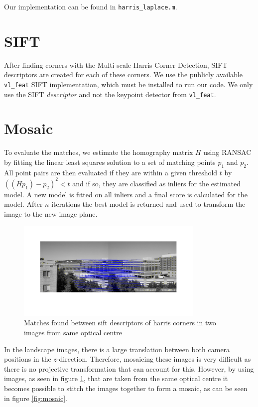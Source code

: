\documentclass[a4paper,10pt]{article}
\begin{document}
Our implementation can be found in \verb+harris_laplace.m+.

\section{SIFT}
After finding corners with the Multi-scale Harris Corner Detection, SIFT descriptors are created for each of these corners.
We use the publicly available \verb+vl_feat+ SIFT implementation, which must be installed to run our code.
We only use the SIFT \emph{descriptor} and not the keypoint detector from \verb+vl_feat+.



\section{Mosaic}
To evaluate the matches, we estimate the homography matrix $H$ using RANSAC by fitting the linear least squares solution to a set of matching points $p_1$ and $p_2$. All point pairs are then evaluated if they are within a given threshold $t$ by $((H p_1)-p_2)^2 < t$ and if so, they are classified as inliers for the estimated model. A new model is fitted on all inliers and a final score is calculated for the model. After $n$ iterations the best model is returned and used to transform the image to the new image plane. 

\begin{figure}[h!t]
\centering
\includegraphics[width=0.8\textwidth]{img/mosaicmatch}
\caption{Matches found between sift descriptors of harris corners in two images from same optical centre}
\label{fig:mosaicmatch}
\end{figure}

In the landscape images, there is a large translation between both camera positions in the $z$-direction. Therefore, mosaicing these images is very difficult as there is no projective transformation that can account for this. However, by using images, as seen in figure \ref{fig:mosaicmatch}, that are taken from the same optical centre it becomes possible to stitch the images together to form a mosaic, as can be seen in figure \ref{fig:mosaic}.
\end{document}
